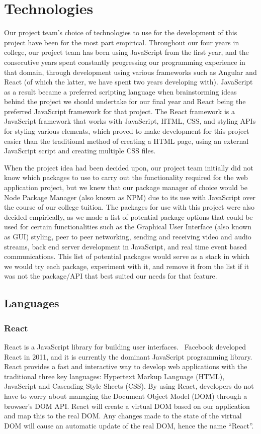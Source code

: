 \section{Technologies}
Our project team’s choice of technologies to use for the development of this project have been for the most part empirical. Throughout our four years in college, our project team has been using JavaScript from the first year, and the consecutive years spent constantly progressing our programming experience in that domain, through development using various frameworks such as Angular and React (of which the latter, we have spent two years developing with). JavaScript as a result became a preferred scripting language when brainstorming ideas behind the project we should undertake for our final year and React being the preferred JavaScript framework for that project. The React framework is a JavaScript framework that works with JavaScript, HTML, CSS, and styling APIs for styling various elements, which proved to make development for this project easier than the traditional method of creating a HTML page, using an external JavaScript script and creating multiple CSS files.

When the project idea had been decided upon, our project team initially did not know which packages to use to carry out the functionality required for the web application project, but we knew  that our package manager of choice would be Node Package Manager (also known as NPM) due to its use with JavaScript over the course of our college tuition. The packages for use with this project were also decided empirically, as we made a list of potential package options that could be used for certain functionalities such as the Graphical User Interface (also known as GUI) styling, peer to peer networking, sending and receiving video and audio streams, back end server development in JavaScript, and real time event based communications. This list of potential packages would serve as a stack in which we would try each package, experiment with it, and remove it from the list if it was not the package/API that best suited our needs for that feature.

\subsection{Languages}
\label{languages}
\subsubsection{React}
React is a JavaScript library for building user interfaces.~\cite{reactjs} Facebook developed React in 2011, and it is currently the dominant JavaScript programming library. React provides a fast and interactive way to develop web applications with the traditional three key languages: Hypertext Markup Language (HTML), JavaScript and Cascading Style Sheets (CSS). By using React, developers do not have to worry about managing the Document Object Model (DOM) through a browser’s DOM API. React will create a virtual DOM based on our application and map this to the real DOM. Any changes made to the state of the virtual DOM will cause an automatic update of the real DOM, hence the name “React”.  

